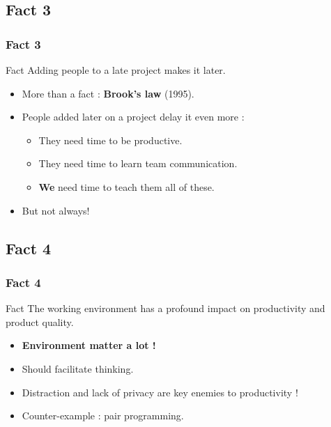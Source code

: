 \documentclass{beamer}
\begin{document}
\subsection{Fact 3}
\begin{frame}
    \frametitle{Fact 3}
    \begin{block}{Fact}
    Adding people to a late project makes it later.
    \end{block}
    \begin{itemize}
     \pause
     \item More than a fact : \textbf{Brook's law} (1995).
     \pause
     \item People added later on a project delay it even more :
     \pause
     \begin{itemize}
      \item They need time to be productive.
      \pause
      \item They need time to learn team communication.
      \pause
      \item \textbf{We} need time to teach them all of these.
     \end{itemize}
     \pause
     \item But not always!
    \end{itemize}

\end{frame}

\subsection{Fact 4}
\begin{frame}
    \frametitle{Fact 4}
    \begin{block}{Fact}
    The working environment has a profound impact on productivity and product
    quality.
    \end{block}
    \begin{itemize}
     \pause
     \item \textbf{Environment matter a lot !}
     \pause
     \item Should facilitate thinking.
     \pause
     \item Distraction and lack of privacy are key enemies to productivity !
     \pause
     \item Counter-example : pair programming.
    \end{itemize}

\end{frame}
\end{document}

